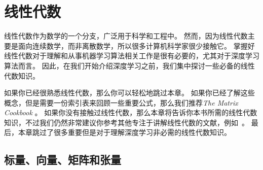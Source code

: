 \chapter{线性代数}
\label{chap:linear_algebra}

线性代数作为数学的一个分支，广泛用于科学和工程中。
然而，因为线性代数主要是面向连续数学，而非离散数学，所以很多计算机科学家很少接触它。
掌握好线性代数对于理解和从事机器学习算法相关工作是很有必要的，尤其对于深度学习算法而言。
因此，在我们开始介绍深度学习之前，我们集中探讨一些必备的线性代数知识。


如果你已经很熟悉线性代数，那么你可以轻松地跳过本章。
如果你已经了解这些概念，但是需要一份索引表来回顾一些重要公式，那么我们推荐\emph{The Matrix Cookbook} \citep{Petersen-Pedersen-2006}。
如果你没有接触过线性代数，那么本章将告诉你本书所需的线性代数知识，不过我们仍然非常建议你参考其他专注于讲解线性代数的文献，例如~\cite{Shilov-1977}。
最后，本章跳过了很多重要但是对于理解深度学习非必需的线性代数知识。




\section{标量、向量、矩阵和张量}
\label{sec:scalars_vectors_matrices_and_tensors}

